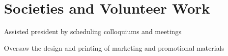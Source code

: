 \documentclass[letterpaper]{deedy-resume} %
\begin{document}
\begin{minipage}[t]{0.66\textwidth}







\section{Societies and Volunteer Work}
\begin{tightitemize}
    \item Assisted president by scheduling colloquiums and meetings
    \item Oversaw the design and printing of marketing and promotional materials
\end{tightitemize}


\end{minipage}
\end{document}
